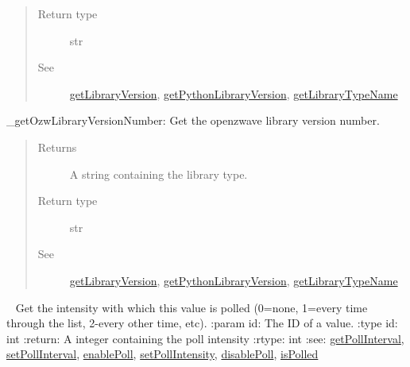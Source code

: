 \documentclass[letterpaper,10pt,english]{sphinxmanual}
\begin{document}
\begin{fulllineitems}
\begin{fulllineitems}
\begin{quote}
\begin{description}
\item[{Return type}] \leavevmode
str

\item[{See}] \leavevmode
{\hyperref[libopenzwave:getlibraryversion]{getLibraryVersion}}, {\hyperref[libopenzwave:getpythonlibraryversion]{getPythonLibraryVersion}}, {\hyperref[libopenzwave:getlibrarytypename]{getLibraryTypeName}}

\end{description}\end{quote}

\end{fulllineitems}


\begin{fulllineitems}
\label{libopenzwave:libopenzwave.PyManager.getOzwLibraryVersionNumber}
\_getOzwLibraryVersionNumber: Get the openzwave library version number.
\begin{quote}\begin{description}
\item[{Returns}] \leavevmode
A string containing the library type.

\item[{Return type}] \leavevmode
str

\item[{See}] \leavevmode
{\hyperref[libopenzwave:getlibraryversion]{getLibraryVersion}}, {\hyperref[libopenzwave:getpythonlibraryversion]{getPythonLibraryVersion}}, {\hyperref[libopenzwave:getlibrarytypename]{getLibraryTypeName}}

\end{description}\end{quote}

\end{fulllineitems}


\begin{fulllineitems}
\label{libopenzwave:libopenzwave.PyManager.getPollIntensity}~\label{libopenzwave:getpollintensity}
Get the intensity with which this value is polled (0=none, 1=every time through the list, 2-every other time, etc).
:param id: The ID of a value.
:type id: int
:return: A integer containing the poll intensity
:rtype: int
:see: {\hyperref[libopenzwave:getpollinterval]{getPollInterval}}, {\hyperref[libopenzwave:setpollinterval]{setPollInterval}}, {\hyperref[libopenzwave:enablepoll]{enablePoll}}, {\hyperref[libopenzwave:setpollintensity]{setPollIntensity}}, {\hyperref[libopenzwave:disablepoll]{disablePoll}}, {\hyperref[libopenzwave:ispolled]{isPolled}}


\end{fulllineitems}
\end{fulllineitems}
\end{document}

